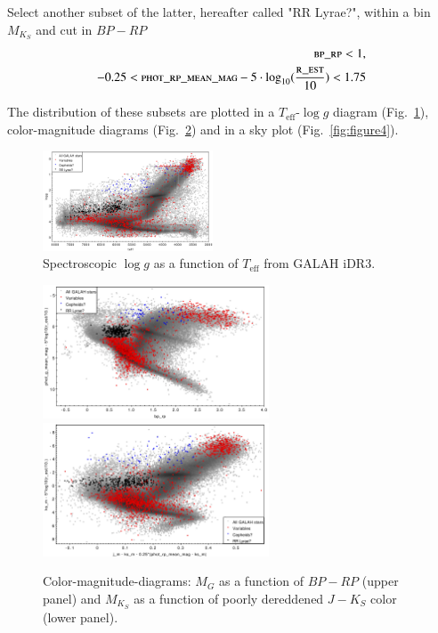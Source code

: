 \documentclass[]{aa}
\begin{document}
Select another subset of the latter, hereafter called "RR Lyrae?", within a bin $M_{K_S}$ and cut in $BP-RP$
\begin{align} \label{eq:cepheids}
	\textsc{bp\_rp} < 1, \\
	-0.25 < \textsc{phot\_rp\_mean\_mag} - 5\cdot \log_{10} (\frac{\textsc{r\_est}}{10}) < 1.75
	\end{align}

The distribution of these subsets are plotted in a $T_\text{eff}$-$\log g$ diagram (Fig.~\ref{fig:figure2}), color-magnitude diagrams (Fig.~\ref{fig:figure3}) and in a sky plot (Fig.~\ref{fig:figure4}). 

\begin{figure}[h!]
\centering
  \includegraphics[width=0.45\textwidth]{Figures/variability_teff_logg.pdf}
    \caption{Spectroscopic $\log g$ as a function of $T_\text{eff}$ from GALAH iDR3.}
    \label{fig:figure2}
\end{figure}

\begin{figure}[h!]
\centering
  \includegraphics[width=0.6\textwidth]{Figures/variability_cmd.pdf}
  \includegraphics[width=0.6\textwidth]{Figures/variability_cmd2.pdf}  
    \caption{Color-magnitude-diagrams: $M_G$ as a function of $BP-RP$ (upper panel) and $M_{K_S}$ as a function of poorly dereddened $J - K_S$ color (lower panel).}
    \label{fig:figure3}
\end{figure}
\end{document}
